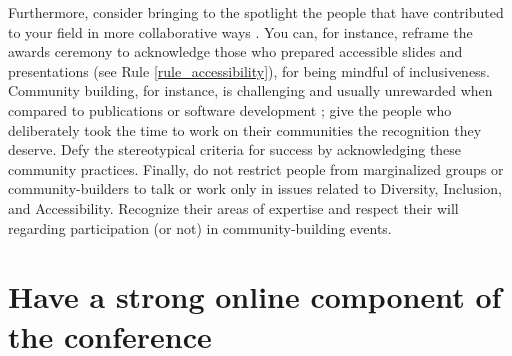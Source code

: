 \documentclass[10pt,letterpaper]{article}
\begin{document}
Furthermore, consider bringing to the spotlight the people that have contributed to your field in more collaborative ways \cite{cheng2020x+}. You can, for instance, reframe the awards ceremony to acknowledge those who prepared accessible slides and presentations (see Rule \ref{rule_accessibility}), for being mindful of inclusiveness. Community building, for instance, is challenging and usually unrewarded when compared to publications or software development \cite{acionWhyChooseCommunity2020}; give the people who deliberately took the time to work on their communities the recognition they deserve. Defy the stereotypical criteria for success by acknowledging these community practices. 
Finally, do not restrict people from marginalized groups or community-builders to talk or work only in issues related to Diversity, Inclusion, and Accessibility. Recognize their areas of expertise and respect their will regarding participation (or not) in community-building events.



\section{Have a strong online component of the conference} 
\label{rule_online}
\end{document}
